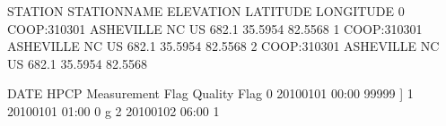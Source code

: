 \documentclass[letterpaper,10pt,english]{sphinxmanual}
\begin{document}
\begin{sphinxVerbatim}[commandchars=\\\{\}]
  
\end{sphinxVerbatim}

\begin{sphinxVerbatim}[commandchars=\\\{\}]
       STATION     STATION\PYGZus{}NAME  ELEVATION  LATITUDE  LONGITUDE  \PYGZbs{}
0  COOP:310301  ASHEVILLE NC US      682.1   35.5954   \PYGZhy{}82.5568   
1  COOP:310301  ASHEVILLE NC US      682.1   35.5954   \PYGZhy{}82.5568   
2  COOP:310301  ASHEVILLE NC US      682.1   35.5954   \PYGZhy{}82.5568   

             DATE   HPCP Measurement Flag Quality Flag  
0  20100101 00:00  99999                ]               
1  20100101 01:00      0                g               
2  20100102 06:00      1                                
\end{sphinxVerbatim}
\end{document}

